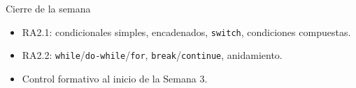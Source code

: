 \documentclass[11pt]{beamer}
\begin{document}
\begin{frame}{Cierre de la semana}
  \begin{itemize}
    \item RA2.1: condicionales simples, encadenados, \texttt{switch}, condiciones compuestas.
    \item RA2.2: \texttt{while}/\texttt{do-while}/\texttt{for}, \texttt{break}/\texttt{continue},
          anidamiento.
    \item Control formativo al inicio de la Semana 3.
  \end{itemize}
\end{frame}
\end{document}
